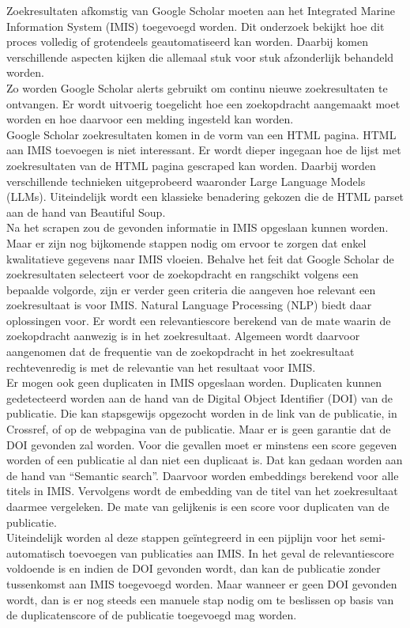 Zoekresultaten afkomstig van Google Scholar moeten aan het Integrated Marine Information System (IMIS) toegevoegd worden. Dit onderzoek bekijkt hoe dit proces volledig of grotendeels geautomatiseerd kan worden. Daarbij komen verschillende aspecten kijken die allemaal stuk voor stuk afzonderlijk behandeld worden.\\
Zo worden Google Scholar alerts gebruikt om continu nieuwe zoekresultaten te ontvangen. Er wordt uitvoerig toegelicht hoe een zoekopdracht aangemaakt moet worden en hoe daarvoor een melding ingesteld kan worden.\\
Google Scholar zoekresultaten komen in de vorm van een HTML pagina. HTML aan IMIS toevoegen is niet interessant. Er wordt dieper ingegaan hoe de lijst met zoekresultaten van de HTML pagina gescraped kan worden. Daarbij worden verschillende technieken uitgeprobeerd waaronder Large Language Models (LLMs). Uiteindelijk wordt een klassieke benadering gekozen die de HTML parset aan de hand van Beautiful Soup.\\
Na het scrapen zou de gevonden informatie in IMIS opgeslaan kunnen worden. Maar er zijn nog bijkomende stappen nodig om ervoor te zorgen dat enkel kwalitatieve gegevens naar IMIS vloeien.
Behalve het feit dat Google Scholar de zoekresultaten selecteert voor de zoekopdracht en rangschikt volgens een bepaalde volgorde, zijn er verder geen criteria die aangeven hoe relevant een zoekresultaat is voor IMIS. Natural Language Processing (NLP) biedt daar oplossingen voor. Er wordt een relevantiescore berekend van de mate waarin de zoekopdracht aanwezig is in het zoekresultaat. Algemeen wordt daarvoor aangenomen dat de frequentie van de zoekopdracht in het zoekresultaat rechtevenredig is met de relevantie van het resultaat voor IMIS.\\
Er mogen ook geen duplicaten in IMIS opgeslaan worden. Duplicaten kunnen gedetecteerd worden aan de hand van de Digital Object Identifier (DOI) van de publicatie. Die kan stapsgewijs opgezocht worden in de link van de publicatie, in Crossref, of op de webpagina van de publicatie. Maar er is geen garantie dat de DOI gevonden zal worden. Voor die gevallen moet er minstens een score gegeven worden of een publicatie al dan niet een duplicaat is. Dat kan gedaan worden aan de hand van ``Semantic search''. Daarvoor worden embeddings berekend voor alle titels in IMIS. Vervolgens wordt de embedding van de titel van het zoekresultaat daarmee vergeleken. De mate van gelijkenis is een score voor duplicaten van de publicatie.\\
Uiteindelijk worden al deze stappen geïntegreerd in een pijplijn voor het semi-automatisch toevoegen van publicaties aan IMIS. In het geval de relevantiescore voldoende is en indien de DOI gevonden wordt, dan kan de publicatie zonder tussenkomst aan IMIS toegevoegd worden. Maar wanneer er geen DOI gevonden wordt, dan is er nog steeds een manuele stap nodig om te beslissen op basis van de duplicatenscore of de publicatie toegevoegd mag worden.
